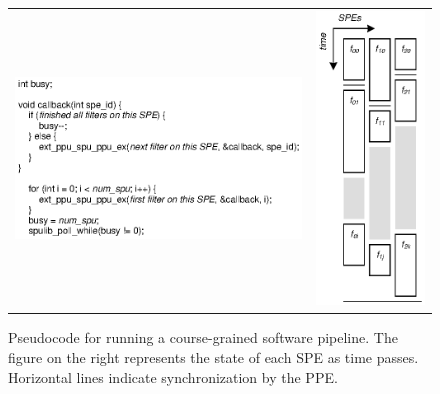 \begin{figure}[!htb]
\begin{center}
\begin{tabular}{ll}
\includegraphics{figs/swpipecode} & \includegraphics{figs/swpipe}
\end{tabular}
\end{center}
\caption[Pseudocode for running a course-grained software pipeline.]{Pseudocode for running a course-grained software pipeline. The figure on the right represents the state of each SPE as time passes. Horizontal lines indicate synchronization by the PPE.}
\label{fig:use:swpipe}
\end{figure}

